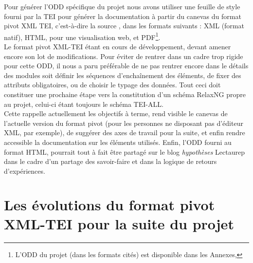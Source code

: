 Pour générer l'ODD spécifique du projet nous avons utiliser une feuille de style  fourni par la TEI pour générer la documentation à partir du canevas du format pivot XML TEI, c'est-à-dire la source , dans les formats suivants : XML (format natif), HTML, pour une visualisation web, et PDF\footnote{L'ODD du projet (dans les formats cités) est disponible dans les Annexes, }.\\

Le format pivot XML-TEI étant en cours de développement, devant amener encore son lot de modifications. Pour éviter de rentrer dans un cadre trop rigide pour cette ODD, il nous a paru préférable de ne pas rentrer encore dans le détails des modules soit définir les séquences d'enchaînement des éléments, de fixer des attributs obligatoires, ou de choisir le typage des données. Tout ceci doit constituer une prochaine étape vers la constitution d'un schéma RelaxNG propre au projet, celui-ci étant toujours le schéma TEI-ALL.\\ 

Cette  rappelle actuellement les objectifs à terme, rend visible le canevas de l'actuelle version du format pivot (pour les personnes ne disposant pas d'éditeur XML, par exemple), de suggérer des axes de travail pour la suite, et enfin rendre accessible la documentation sur les éléments utilisés. Enfin, l'ODD fourni au format HTML, pourrait tout à fait être partagé sur le blog \textit{hypothèses} Lectaurep dans le cadre d'un partage des savoir-faire et dans la logique de retours d'expériences.

\section{Les évolutions du format pivot XML-TEI pour la suite du projet}

